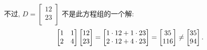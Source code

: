 \documentclass[../libro.tex]{subfiles}
\begin{document}
\begin{example}
    不过,
    \(
        D =
        \begin{bmatrix}
            12 \\
            23 \\
        \end{bmatrix}
    \)
    不是此方程组的一个解:
    \begin{equation*}
        \begin{bmatrix}
            1 & 1 \\
            2 & 4 \\
        \end{bmatrix}
        \begin{bmatrix}
            12 \\
            23 \\
        \end{bmatrix}
        =
        \begin{bmatrix}
            1 \cdot 12 + 1 \cdot 23 \\
            2 \cdot 12 + 4 \cdot 23 \\
        \end{bmatrix}
        =
        \begin{bmatrix}
            35  \\
            116 \\
        \end{bmatrix}
        \neq
        \begin{bmatrix}
            35 \\
            94 \\
        \end{bmatrix}.
        \qedhere
    \end{equation*}
\end{example}
\end{document}
